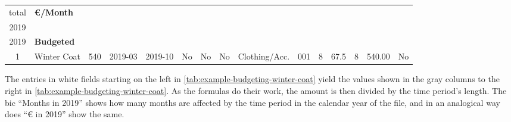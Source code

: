 \begin{table}[hbtp]
\begin{tabular}{|c|l|l|l|l|c|c|c|r|c|r|c|r|r|c|}
\begin{minipage}[b][0.8cm]{1cm}
			total
		\end{minipage} &
		\footnotesize\bfseries €/Month &
		\begin{minipage}[b]{1.2cm}\footnotesize\bfseries
			Months in\\
			2019
		\end{minipage} &
		\begin{minipage}[b]{0.6cm}\footnotesize\bfseries
			€ in\\
			2019
		\end{minipage} &
		\footnotesize\bfseries Budgeted\\ 
		\hline
		\hline
		1 & Winter Coat & 540 & 2019-03 & 2019-10 & No & No & No & Clothing/Acc. & \cellcolor{lightgray}001 & \cellcolor{lightgray}8 & \cellcolor{lightgray}67.5 & \cellcolor{lightgray}8 & \cellcolor{lightgray}540.00 & \cellcolor{lightgray}No\\
		\hline
	\end{tabular}
\end{table}

The entries in white fields starting on the left in \autoref{tab:example-budgeting-winter-coat} yield the values shown in the gray columns to the right in \autoref{tab:example-budgeting-winter-coat}.
As the formulas do their work, the amount is then divided by the time period's length.
The \ac{bic} ``Months in 2019'' shows how many months are affected by the time period in the calendar year of the file, and in an analogical way does ``€ in 2019'' show the same.


